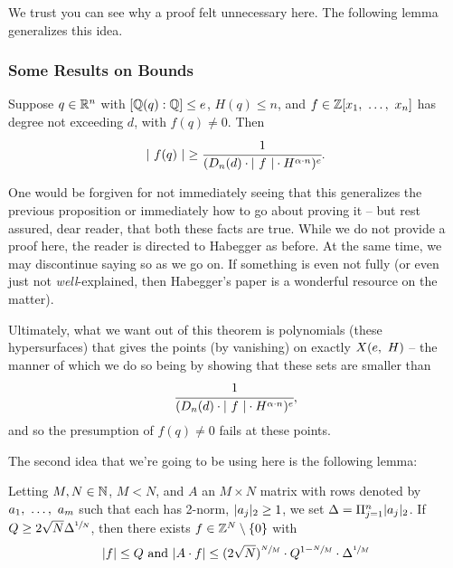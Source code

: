 We trust you can see why a proof felt unnecessary here. The following lemma generalizes this idea.

\subsubsection{Some Results on Bounds}

\begin{lemma}
  Suppose $q \in \R^n$ with $[\Q(q) : \Q] \leq e$, $H(q) \leq n$, and $f \in \Z[x_1, \ \hdots, \ x_n]$ has degree not exceeding $d$, with $f(q) \neq 0$. Then
    \begin{align*}
      \lvrv{f(q)} \geq \cfrac{1}{(D_n(d) \cdot \lvrv{f} \cdot H^{\alpha \cdot n})^e}.
    \end{align*}
\end{lemma}

One would be forgiven for not immediately seeing that this generalizes the previous proposition or immediately how to go about proving it -- but rest assured, dear reader, that both these facts are true. While we do not provide a proof here, the reader is directed to Habegger \cite{habegger_diophantine_2016} as before. At the same time, we may discontinue saying so as we go on. If something is even not fully (or even just not \emph{well}-explained, then Habegger's paper is a wonderful resource on the matter).

Ultimately, what we want out of this theorem is polynomials (these hypersurfaces) that gives the points (by vanishing) on exactly $\XeH[H]{e}$ -- the manner of which we do so being by showing that these sets are smaller than
  \begin{align*}
    \cfrac{1}{(D_n(d) \cdot \lvrv{f} \cdot H^{\alpha \cdot n})^e},
  \end{align*}
and so the presumption of $f(q) \neq 0$ fails at these points.

The second idea that we're going to be using here is the following lemma:
\begin{lemma}
  Letting $M, N \in \N$, $M < N$, and $A$ an $M \times N$ matrix with rows denoted by $\vonevm{a}{m}$ such that each has 2-norm, $\twonorm{a_j} \geq 1$, we set $\Delta = \Pi_{j=1}^{n} \twonorm{a_j}$. If $Q \geq 2 \sqrt{N} \Delta^{\sfrac{1}{N}}$, then there exists $f \in \Z^N \setminus \zeroset$ with
    \begin{align*}
      \norm{f} \leq Q \textrm{ and } \norm{A \cdot f} \leq (2 \sqrt{N})^{\sfrac{N}{M}} \cdot Q^{1 - \sfrac{N}{M}} \cdot \Delta^{\sfrac{1}{M}}
    \end{align*}
\end{lemma}

